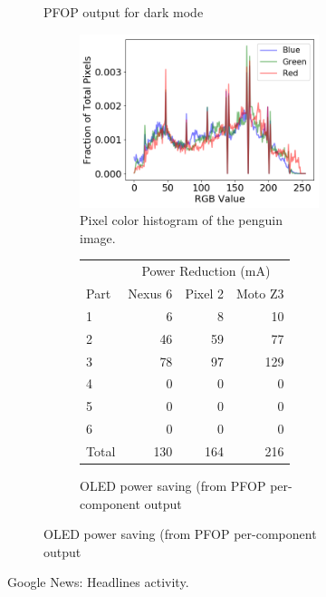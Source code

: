 \begin{figure}[th]
\begin{subfigure}[]{\columnwidth}
		\caption{PFOP output for dark mode}
	\end{subfigure}
	\begin{subfigure}[]{\columnwidth}
	\begin{subfigure}[]{0.42\columnwidth}
		\includegraphics[width=\columnwidth]{./figure/692a_news_penguin.png}
		\caption{Pixel color histogram of the penguin image.}
		\label{fig:case_study_embedde_object}
	\end{subfigure}
	\begin{subfigure}[]{0.38\columnwidth}
	\centering
	{ \scriptsize
	\begin{tabular}{ | l | r | r | r | }
		\hline
		     & \multicolumn{3}{|c|}{Power Reduction (mA)}\\
		\cline{2-4}
                Part & Nexus 6 & Pixel 2 & Moto Z3 \\
		\hline
		1 &   6  &   8 &   10  \\
		2 &  46  &  59 &   77  \\
		3 &  78  &  97 &  129  \\
		4 &   0  &   0 &    0  \\
		5 &   0  &   0 &    0  \\
		6 &   0  &   0 &    0  \\
		\hline
		Total   & 130 & 164 & 216  \\
		\hline
	\end{tabular}
	}
	\caption{OLED power saving (from PFOP per-component output}		
	\end{subfigure}
        \vspace{-0.1in}
	\end{subfigure}
	\caption{Google News: Headlines activity.}
        \vspace{-0.20in}
	\label{fig:case_study_news}
\end{figure}

